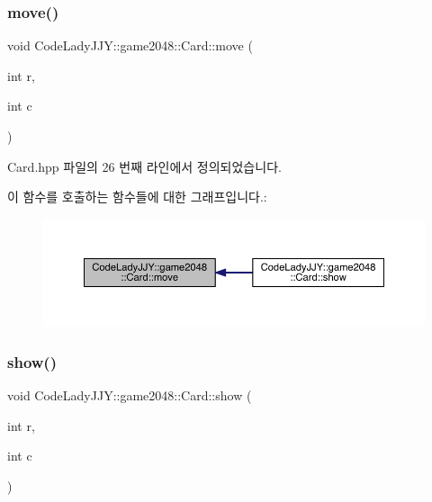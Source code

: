 \subsubsection{\texorpdfstring{move()}{move()}}
{\footnotesize\ttfamily void Code\+Lady\+J\+J\+Y\+::game2048\+::\+Card\+::move (\begin{DoxyParamCaption}\item[{int}]{r,  }\item[{int}]{c }\end{DoxyParamCaption})\hspace{0.3cm}{\ttfamily [inline]}}



Card.\+hpp 파일의 26 번째 라인에서 정의되었습니다.

이 함수를 호출하는 함수들에 대한 그래프입니다.\+:
\nopagebreak
\begin{figure}[H]
\begin{center}
\leavevmode
\includegraphics[width=350pt]{class_code_lady_j_j_y_1_1game2048_1_1_card_a6ad341b10626a9cc1aafe8229fa61ea6_icgraph}
\end{center}
\end{figure}
\mbox{\label{class_code_lady_j_j_y_1_1game2048_1_1_card_abd3f3208867d1450ba4eeef3cef62d3f}} 
\subsubsection{\texorpdfstring{show()}{show()}}
{\footnotesize\ttfamily void Code\+Lady\+J\+J\+Y\+::game2048\+::\+Card\+::show (\begin{DoxyParamCaption}\item[{int}]{r,  }\item[{int}]{c }\end{DoxyParamCaption})\hspace{0.3cm}{\ttfamily [inline]}}



